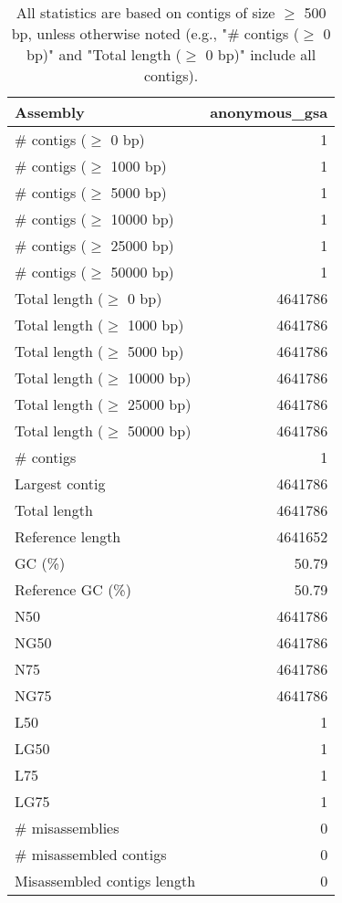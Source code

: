 \documentclass[12pt,a4paper]{article}
\begin{document}
\begin{table}[ht]
\begin{center}
\caption{All statistics are based on contigs of size $\geq$ 500 bp, unless otherwise noted (e.g., "\# contigs ($\geq$ 0 bp)" and "Total length ($\geq$ 0 bp)" include all contigs).}
\begin{tabular}{|l*{1}{|r}|}
\hline
Assembly & anonymous\_gsa \\ \hline
\# contigs ($\geq$ 0 bp) & 1 \\ \hline
\# contigs ($\geq$ 1000 bp) & 1 \\ \hline
\# contigs ($\geq$ 5000 bp) & 1 \\ \hline
\# contigs ($\geq$ 10000 bp) & 1 \\ \hline
\# contigs ($\geq$ 25000 bp) & 1 \\ \hline
\# contigs ($\geq$ 50000 bp) & 1 \\ \hline
Total length ($\geq$ 0 bp) & 4641786 \\ \hline
Total length ($\geq$ 1000 bp) & 4641786 \\ \hline
Total length ($\geq$ 5000 bp) & 4641786 \\ \hline
Total length ($\geq$ 10000 bp) & 4641786 \\ \hline
Total length ($\geq$ 25000 bp) & 4641786 \\ \hline
Total length ($\geq$ 50000 bp) & 4641786 \\ \hline
\# contigs & 1 \\ \hline
Largest contig & 4641786 \\ \hline
Total length & 4641786 \\ \hline
Reference length & 4641652 \\ \hline
GC (\%) & 50.79 \\ \hline
Reference GC (\%) & 50.79 \\ \hline
N50 & 4641786 \\ \hline
NG50 & 4641786 \\ \hline
N75 & 4641786 \\ \hline
NG75 & 4641786 \\ \hline
L50 & 1 \\ \hline
LG50 & 1 \\ \hline
L75 & 1 \\ \hline
LG75 & 1 \\ \hline
\# misassemblies & 0 \\ \hline
\# misassembled contigs & 0 \\ \hline
Misassembled contigs length & 0 \\ \hline

\end{tabular}
\end{center}
\end{table}
\end{document}
